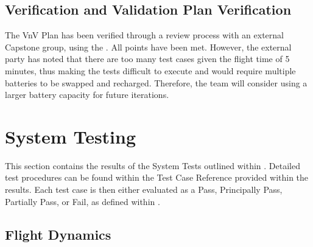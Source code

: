 \documentclass[12pt, titlepage]{article}
\begin{document}
\clearpage

\subsection{Verification and Validation Plan Verification}
\label{subsec:vnvVerification}

The VnV Plan has been verified through a review process with an external Capstone group, using the  . All points have been met. However, the external party has noted that there are too many test cases given the flight time of 5 minutes, thus making the tests difficult to execute and would require multiple batteries to be swapped and recharged. Therefore, the team will consider using a larger battery capacity for future iterations.


\section{System Testing}
\label{sec:SystemTesting}

This section contains the results of the System Tests outlined within . Detailed test procedures can be found within the Test Case Reference provided within the results. Each test case is then either evaluated as a Pass, Principally Pass, Partially Pass, or Fail, as defined within .

\subsection{Flight Dynamics}
\end{document}
